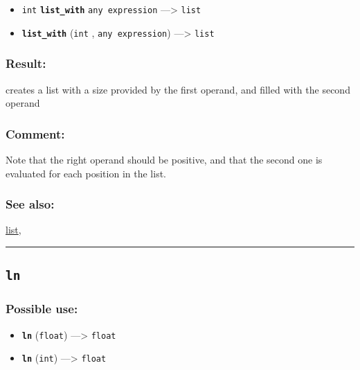 \documentclass[]{book}
\providecommand{\tightlist}{%
  \setlength{\itemsep}{0pt}\setlength{\parskip}{0pt}}
\theoremstyle{definition}
\theoremstyle{definition}
\theoremstyle{definition}
\theoremstyle{remark}
\begin{document}
\begin{itemize}
\tightlist
\item
  \texttt{int} \textbf{\texttt{list\_with}} \texttt{any\ expression}
  ---\textgreater{} \texttt{list}
\item
  \textbf{\texttt{list\_with}} (\texttt{int} , \texttt{any\ expression})
  ---\textgreater{} \texttt{list}
\end{itemize}

\subsubsection{Result:}\label{result-314}

creates a list with a size provided by the first operand, and filled
with the second operand

\subsubsection{Comment:}\label{comment-61}

Note that the right operand should be positive, and that the second one
is evaluated for each position in the list.

\subsubsection{See also:}\label{see-also-127}

\href{OperatorsIM\#list}{list},

\begin{center}\rule{0.5\linewidth}{\linethickness}\end{center}

\subsection{\texorpdfstring{\texttt{ln}}{ln}}\label{ln}

\subsubsection{Possible use:}\label{possible-use-325}

\begin{itemize}
\tightlist
\item
  \textbf{\texttt{ln}} (\texttt{float}) ---\textgreater{} \texttt{float}
\item
  \textbf{\texttt{ln}} (\texttt{int}) ---\textgreater{} \texttt{float}
\end{itemize}
\end{document}
